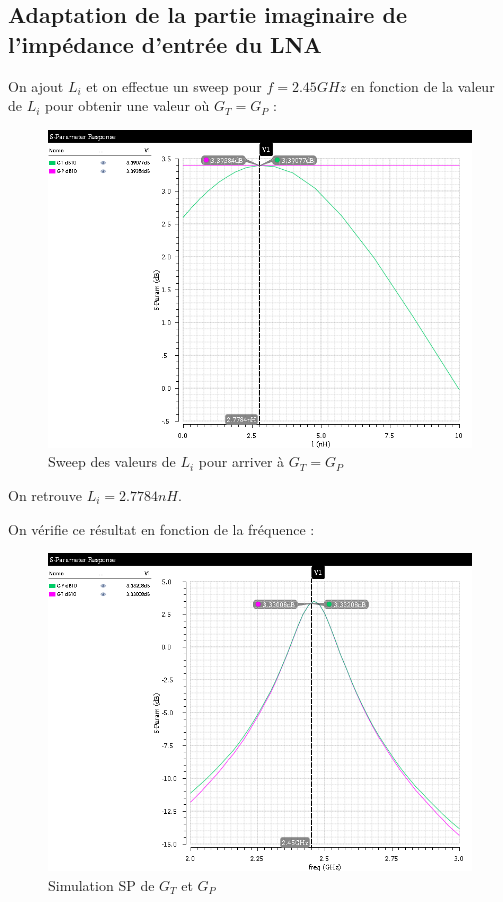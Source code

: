 \documentclass[a4paper]{article}
\begin{document}
\subsection{Adaptation de la partie imaginaire de l'imp\'edance d'entr\'ee du LNA}
On ajout $L_i$ et on effectue un sweep pour $f=2.45GHz$ en fonction de la valeur de $L_i$
pour obtenir une valeur o\`u $G_T = G_P$ :

\begin{figure}[!htb]
\begin{center}
  \includegraphics[scale=0.45]{Q5-L_i-sweep.png}
  \caption{Sweep des valeurs de $L_i$ pour arriver \`a $G_T = G_P$}
  \label{sim-li-sweep}
\end{center}
\end{figure}

On retrouve $L_i = 2.7784 nH$.\\

\clearpage

On v\'erifie ce r\'esultat en fonction de la fr\'equence :

\begin{figure}[!htb]
\begin{center}
  \includegraphics[scale=0.45]{Q5-GT-GP-db20.png}
  \caption{Simulation SP de $G_T$ et $G_P$  }
  \label{sim-li-gt-gp}
\end{center}
\end{figure}
\end{document}
